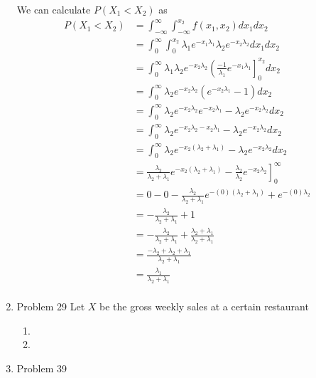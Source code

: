 \documentclass[11pt]{article}
\begin{document}
\begin{enumerate}
We can calculate $P(X_1<X_2)$ as
\begin{align*}
P(X_1<X_2) &= \int_{-\infty}^{\infty} \int_{-\infty}^{x_2} f(x_1,x_2)dx_1dx_2\\
&= \int_0^{\infty} \int_0^{x_2} \lambda_1e^{-x_1\lambda_1}\lambda_2e^{-x_2\lambda_2}dx_1dx_2\\
&= \int_0^{\infty} \lambda_1\lambda_2e^{-x_2\lambda_2}\left(\frac{-1}{\lambda_1}e^{-x_1\lambda_1}\right]_0^{x_2}dx_2\\
&= \int_0^{\infty} \lambda_2e^{-x_2\lambda_2}\left(e^{-x_2\lambda_1} - 1\right)dx_2\\
&= \int_0^{\infty} \lambda_2e^{-x_2\lambda_2}e^{-x_2\lambda_1} - \lambda_2e^{-x_2\lambda_2}dx_2\\
&= \int_0^{\infty} \lambda_2e^{-x_2\lambda_2-x_2\lambda_1} - \lambda_2e^{-x_2\lambda_2}dx_2\\
&= \int_0^{\infty} \lambda_2e^{-x_2(\lambda_2+\lambda_1)} - \lambda_2e^{-x_2\lambda_2}dx_2\\
&= \left.\frac{\lambda_2}{\lambda_2+\lambda_1}e^{-x_2(\lambda_2+\lambda_1)} - \frac{\lambda_2}{\lambda_2}e^{-x_2\lambda_2}\right]_0^{\infty}\\
&= \left.0 - 0 - \frac{\lambda_2}{\lambda_2+\lambda_1}e^{-(0)(\lambda_2+\lambda_1)} + e^{-(0)\lambda_2}\right.\\
&= -\frac{\lambda_2}{\lambda_2+\lambda_1}+1\\
&= -\frac{\lambda_2}{\lambda_2+\lambda_1} + \frac{\lambda_2+\lambda_1}{\lambda_2+\lambda_1}\\
&= \frac{-\lambda_2 + \lambda_2+\lambda_1}{\lambda_2+\lambda_1}\\
&= \frac{\lambda_1}{\lambda_2+\lambda_1}\\
\end{align*}

\item Problem 29
Let $X$ be the gross weekly sales at a certain restaurant
\begin{enumerate}
\item
\item
\end{enumerate}

\item Problem 39\\

\end{enumerate}
\end{document}

